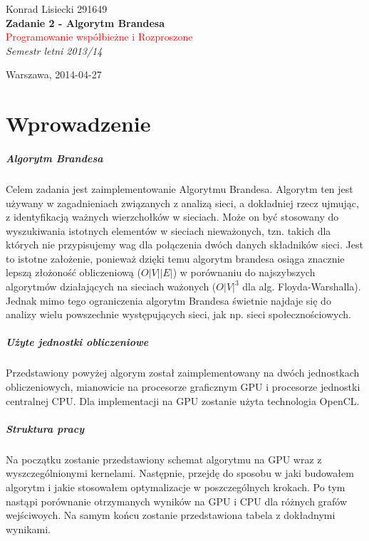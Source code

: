 \documentclass[oneside]{book}
\newcommand*{\titleTH}{\begingroup %
\raggedleft %
\vspace*{\baselineskip} %

{\Large Konrad Lisiecki 291649}\\[0.167\textheight] %

{\LARGE\bfseries Zadanie 2 - Algorytm Brandesa}\\[\baselineskip] %

{\textcolor{Red}{\Huge Programowanie współbieżne i Rozproszone}}\\[\baselineskip] %

{\Large \textit{Semestr letni 2013/14  }}\par %

\vfill %

{\large  Warszawa, 2014-04-27}\par %
\renewcommand{\chaptername}{Podpunkt}

\vspace*{3\baselineskip} %
\endgroup}
\begin{document}
 

\pagestyle{empty} %
	

\titleTH %


\tableofcontents


\chapter{Wprowadzenie}
\paragraph{Algorytm Brandesa} 

Celem zadania jest zaimplementowanie Algorytmu Brandesa. Algorytm ten jest używany w zagadnieniach związanych z analizą sieci, a dokładniej rzecz ujmując, z identyfikacją ważnych wierzchołków w sieciach. Może on być stosowany do wyszukiwania istotnych elementów w sieciach nieważonych, tzn. takich dla których nie przypisujemy wag dla połączenia dwóch danych składników sieci. Jest to istotne założenie, ponieważ dzięki temu algorytm brandesa osiąga znacznie lepszą złożoność obliczeniową ($O|V||E|$) w porównaniu do najszybszych
algorytmów działających na sieciach ważonych ($O |V|^3$ dla alg. Floyda-Warshalla). Jednak mimo tego ograniczenia algorytm Brandesa świetnie najdaje się do analizy wielu powszechnie występujących sieci, jak np. sieci społecznościowych.


\paragraph{Użyte jednostki obliczeniowe} Przedstawiony powyżej algorym został zaimplementowany na dwóch jednostkach obliczeniowych, mianowicie na procesorze graficznym GPU i procesorze jednostki centralnej CPU. Dla implementacji na GPU zostanie użyta technologia OpenCL. 

\paragraph{Struktura pracy} Na początku zostanie przedstawiony schemat algorytmu na GPU wraz z wyszczególnionymi kernelami. Następnie, przejdę do sposobu w jaki budowałem algorytm i jakie stosowałem optymalizacje w poszczególnych krokach. Po tym nastąpi porównanie otrzymanych wyników na GPU i CPU dla różnych grafów wejściwoych. Na samym końcu zostanie przedstawiona tabela z dokładnymi wynikami. 
\end{document}
